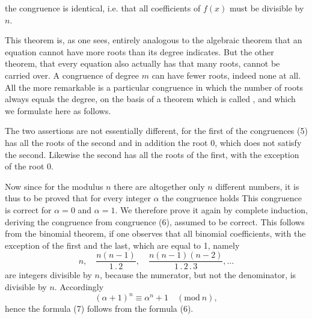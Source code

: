 the congruence is identical, i.e. that all coefficients of $f(x)$
must be divisible by $n$.

This theorem is, as one sees, entirely analogous to the algebraic theorem that an equation cannot have more roots
than its degree indicates. But the other theorem, that every
equation also actually has that many roots, cannot be carried
over. A congruence of degree $m$ can have fewer roots, indeed
none at all. All the more remarkable is a particular
congruence in which the number of roots always equals the
degree, on the basis of a theorem which is called , and which we formulate here as follows.


The two assertions are not essentially different, for
the first of the congruences (5) has all the roots of the second and
in addition the root 0, which does not satisfy the second. Likewise
the second has all the roots of the first, with the exception of the
root 0.

Now since for the modulus $n$ there are altogether only $n$ different
numbers, it is thus to be proved that for every integer
$\alpha$ the congruence holds
This congruence is correct for $\alpha = 0$ and $\alpha = 1$. We
therefore prove it again by complete induction, deriving the congruence
from congruence (6), assumed to be correct. This follows from the binomial theorem,
if one observes that all binomial coefficients, with the exception of the first and the last, which are equal to 1, namely
\[
n, \quad \frac{n(n-1)}{1\,.\,2}, \quad \frac{n(n-1)(n-2)}{1\,.\,2\,.\,3}, \dots
\]
are integers divisible by $n$, because the numerator, but not
the denominator, is divisible by $n$. Accordingly
\[
(\alpha + 1)^n \equiv \alpha^n + 1 \quad (\mathrm{mod}\ n),
\]
hence the formula (7) follows from the formula (6).
